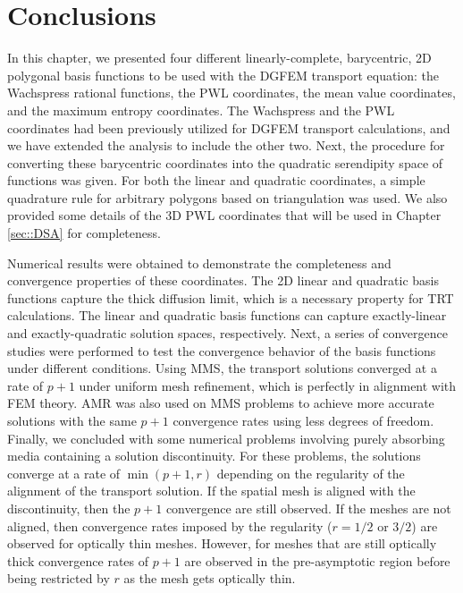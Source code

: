 \section{Conclusions}
\label{sec::BF_Conclusions}

In this chapter, we presented four different linearly-complete, barycentric, 2D polygonal basis functions to be used with the DGFEM transport equation: the Wachspress rational functions, the PWL coordinates, the mean value coordinates, and the maximum entropy coordinates. The Wachspress and the PWL coordinates had been previously utilized for DGFEM transport calculations, and we have extended the analysis to include the other two. Next, the procedure for converting these barycentric coordinates into the quadratic serendipity space of functions was given. For both the linear and quadratic coordinates, a simple quadrature rule for arbitrary polygons based on triangulation was used. We also provided some details of the 3D PWL coordinates that will be used in Chapter \ref{sec::DSA} for completeness.

Numerical results were obtained to demonstrate the completeness and convergence properties of these coordinates. The 2D linear and quadratic basis functions capture the thick diffusion limit, which is a necessary property for TRT calculations. The linear and quadratic basis functions can capture exactly-linear and exactly-quadratic solution spaces, respectively. Next, a series of convergence studies were performed to test the convergence behavior of the basis functions under different conditions. Using MMS, the transport solutions converged at a rate of $p+1$ under uniform mesh refinement, which is perfectly in alignment with FEM theory. AMR was also used on MMS problems to achieve more accurate solutions with the same $p+1$ convergence rates using less degrees of freedom. Finally, we concluded with some numerical problems involving purely absorbing media containing a solution discontinuity. For these problems, the solutions converge at a rate of $\min ( p+1 , r)$ depending on the regularity of the alignment of the transport solution. If the spatial mesh is aligned with the discontinuity, then the $p+1$ convergence are still observed. If the meshes are not aligned, then convergence rates imposed by the regularity ($r=1/2$ or $3/2$) are observed for optically thin meshes. However, for meshes that are still optically thick convergence rates of $p+1$ are observed in the pre-asymptotic region before being restricted by $r$ as the mesh gets optically thin.



